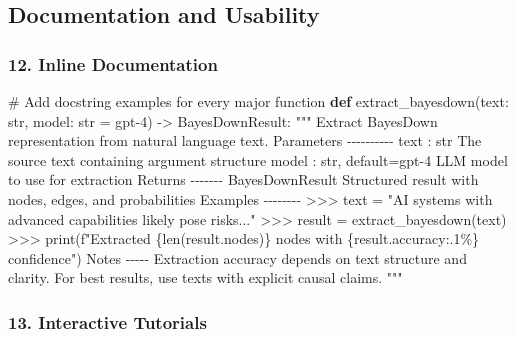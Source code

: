 \documentclass[
  11pt,
  letterpaper,
]{book}
\newenvironment{Shaded}{\begin{snugshade}}{\end{snugshade}}
\newcommand{\BuiltInTok}[1]{\textcolor[rgb]{0.00,0.23,0.31}{#1}}
\newcommand{\CommentTok}[1]{\textcolor[rgb]{0.37,0.37,0.37}{#1}}
\newcommand{\KeywordTok}[1]{\textcolor[rgb]{0.00,0.23,0.31}{\textbf{#1}}}
\newcommand{\NormalTok}[1]{\textcolor[rgb]{0.00,0.23,0.31}{#1}}
\newcommand{\OperatorTok}[1]{\textcolor[rgb]{0.37,0.37,0.37}{#1}}
\newcommand{\StringTok}[1]{\textcolor[rgb]{0.13,0.47,0.30}{#1}}
\begin{document}
\subsection{Documentation and
Usability}\label{documentation-and-usability}

\subsubsection{12. Inline Documentation}\label{inline-documentation}

\begin{Shaded}
\begin{Highlighting}[]
\CommentTok{\# Add docstring examples for every major function}
\KeywordTok{def}\NormalTok{ extract\_bayesdown(text: }\BuiltInTok{str}\NormalTok{, model: }\BuiltInTok{str} \OperatorTok{=} \StringTok{\textquotesingle{}gpt{-}4\textquotesingle{}}\NormalTok{) }\OperatorTok{{-}\textgreater{}}\NormalTok{ BayesDownResult:}
    \CommentTok{"""}
\CommentTok{    Extract BayesDown representation from natural language text.}
\CommentTok{    }
\CommentTok{    Parameters}
\CommentTok{    {-}{-}{-}{-}{-}{-}{-}{-}{-}{-}}
\CommentTok{    text : str}
\CommentTok{        The source text containing argument structure}
\CommentTok{    model : str, default=\textquotesingle{}gpt{-}4\textquotesingle{}}
\CommentTok{        LLM model to use for extraction}
\CommentTok{        }
\CommentTok{    Returns}
\CommentTok{    {-}{-}{-}{-}{-}{-}{-}}
\CommentTok{    BayesDownResult}
\CommentTok{        Structured result with nodes, edges, and probabilities}
\CommentTok{        }
\CommentTok{    Examples}
\CommentTok{    {-}{-}{-}{-}{-}{-}{-}{-}}
\CommentTok{    \textgreater{}\textgreater{}\textgreater{} text = "AI systems with advanced capabilities likely pose risks..."}
\CommentTok{    \textgreater{}\textgreater{}\textgreater{} result = extract\_bayesdown(text)}
\CommentTok{    \textgreater{}\textgreater{}\textgreater{} print(f"Extracted \{len(result.nodes)\} nodes with \{result.accuracy:.1\%\} confidence")}
\CommentTok{    }
\CommentTok{    Notes}
\CommentTok{    {-}{-}{-}{-}{-}}
\CommentTok{    Extraction accuracy depends on text structure and clarity.}
\CommentTok{    For best results, use texts with explicit causal claims.}
\CommentTok{    """}
\end{Highlighting}
\end{Shaded}

\subsubsection{13. Interactive Tutorials}\label{interactive-tutorials}
\end{document}
